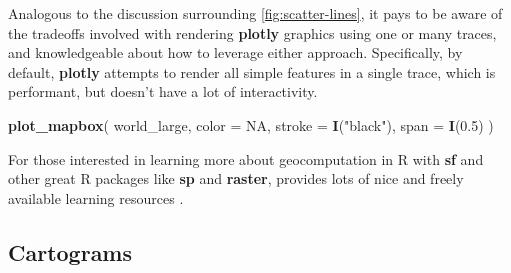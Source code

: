 \documentclass[
  12pt,
]{krantz}
\newenvironment{Shaded}{\begin{snugshade}}{\end{snugshade}}
\newcommand{\CommentTok}[1]{\textcolor[rgb]{0.56,0.35,0.01}{\textit{#1}}}
\newcommand{\DataTypeTok}[1]{\textcolor[rgb]{0.13,0.29,0.53}{#1}}
\newcommand{\FloatTok}[1]{\textcolor[rgb]{0.00,0.00,0.81}{#1}}
\newcommand{\KeywordTok}[1]{\textcolor[rgb]{0.13,0.29,0.53}{\textbf{#1}}}
\newcommand{\NormalTok}[1]{#1}
\newcommand{\OperatorTok}[1]{\textcolor[rgb]{0.81,0.36,0.00}{\textbf{#1}}}
\newcommand{\OtherTok}[1]{\textcolor[rgb]{0.56,0.35,0.01}{#1}}
\newcommand{\StringTok}[1]{\textcolor[rgb]{0.31,0.60,0.02}{#1}}
\begin{document}
\begin{Shaded}
\end{Shaded}

Analogous to the discussion surrounding \ref{fig:scatter-lines}, it pays to be aware of the tradeoffs involved with rendering \textbf{plotly} graphics using one or many traces, and knowledgeable about how to leverage either approach. Specifically, by default, \textbf{plotly} attempts to render all simple features in a single trace, which is performant, but doesn't have a lot of interactivity.

\begin{Shaded}
\begin{Highlighting}[]
\KeywordTok{plot_mapbox}\NormalTok{(}
\NormalTok{  world_large, }
  \DataTypeTok{color =} \OtherTok{NA}\NormalTok{, }
  \DataTypeTok{stroke =} \KeywordTok{I}\NormalTok{(}\StringTok{"black"}\NormalTok{), }
  \DataTypeTok{span =} \KeywordTok{I}\NormalTok{(}\FloatTok{0.5}\NormalTok{)}
\NormalTok{)}
\end{Highlighting}
\end{Shaded}

For those interested in learning more about geocomputation in R with \textbf{sf} and other great R packages like \textbf{sp} and \textbf{raster}, \citet{geocomputation} provides lots of nice and freely available learning resources \citep{sp, raster}.

\hypertarget{cartograms}{%
\subsection{Cartograms}\label{cartograms}}

\end{document}
